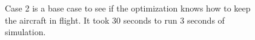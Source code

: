\documentclass[letterpaper, 10 pt, conference]{ieeeconf}  %
\begin{document}
\begin{figure}[htbp]
	\centering
	\qquad
	\caption{Case 2 is a base case to see if the optimization knows how to keep the aircraft in  flight. It took 30 seconds to run 3 seconds of simulation.}
	\label{fig:fw_circle}
\end{figure}
\end{document}
